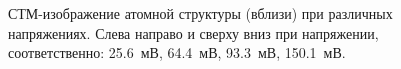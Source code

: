 \documentclass[a4paper, 12pt]{article}
\begin{document}
	\begin{figure}[H]
		\centering
		
		\caption{СТМ-изображение атомной структуры (вблизи) при различных напряжениях. Слева направо и сверху вниз при напряжении, соответственно: 25.6~мВ, 64.4~мВ, 93.3~мВ, 150.1~мВ.}
		\label{fig:2_different_volt}
	\end{figure}
	
\end{document}
